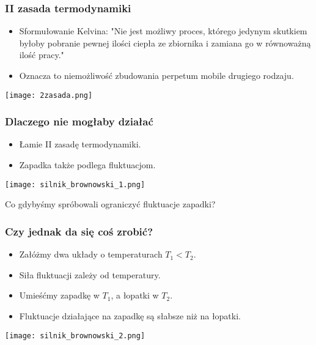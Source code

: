 \documentclass[10pt]{beamer}
\begin{document}
	\begin{frame}
		\frametitle{II zasada termodynamiki}
			\begin{minipage}{1\textwidth}
				\begin{itemize}
					\item Sformułowanie Kelvina: "Nie jest możliwy proces, którego jedynym skutkiem byłoby pobranie pewnej ilości ciepła ze zbiornika i zamiana go w równoważną ilość pracy."
					\item Oznacza to niemożliwość zbudowania perpetum mobile drugiego rodzaju.
				\end{itemize}
			\end{minipage}
			\begin{minipage}{1\textwidth}
				\Centering
				\vspace{0.4cm}
				\texttt{[image: 2zasada.png]}
			\end{minipage}
	\end{frame}
	\begin{frame}
		\frametitle{Dlaczego nie mogłaby działać}
			\begin{minipage}{1\textwidth}
				\begin{itemize}
					\item Łamie II zasadę termodynamiki.
					\item Zapadka także podlega fluktuacjom.
				\end{itemize}
		\end{minipage}
		\begin{minipage}{1\textwidth}
			\vspace{0.5cm}
			\Centering
			\texttt{[image: silnik\_brownowski\_1.png]}
		\end{minipage}
		\vfill Co gdybyśmy spróbowali ograniczyć fluktuacje zapadki?
	\end{frame}	
	\begin{frame}
		\frametitle{Czy jednak da się coś zrobić?}
		\begin{minipage}{1\textwidth}
			\justify
			\hspace{1em}
			\begin{itemize}
				\item Załóżmy dwa układy o temperaturach $T_1<T_2$.
				\item Siła fluktuacji zależy od temperatury.
				\item Umieśćmy zapadkę w $T_1$, a łopatki w $T_2$.
				\item Fluktuacje działające na zapadkę są słabsze niż na łopatki.
			\end{itemize}
		\end{minipage}
		\begin{minipage}{1\textwidth}
			\vspace{0.4cm}
			\Centering
			\texttt{[image: silnik\_brownowski\_2.png]}
		\end{minipage}
	\end{frame}
\end{document}
